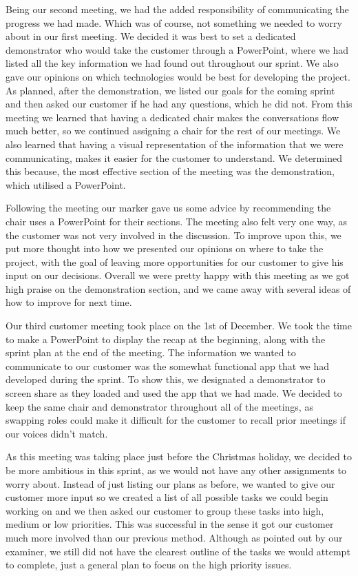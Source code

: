 \documentclass{l3proj}
\begin{document}
Being our second meeting, we had the added responsibility of communicating the progress we had made. Which was of course, not something we needed to worry about in our first meeting. We decided it was best to set a dedicated demonstrator who would take the customer through a PowerPoint, where we had listed all the key information we had found out throughout our sprint. We also gave our opinions on which technologies would be best for developing the project. As planned, after the demonstration, we listed our goals for the coming sprint and then asked our customer if he had any questions, which he did not. From this meeting we learned that having a dedicated chair makes the conversations flow much better, so we continued assigning a chair for the rest of our meetings. We also learned that having a visual representation of the information that we were communicating, makes it easier for the customer to understand. We determined this because, the most effective section of the meeting was the demonstration, which utilised a PowerPoint.\par
Following the meeting our marker gave us some advice by recommending the chair uses a PowerPoint for their sections. The meeting also felt very one way, as the customer was not very involved in the discussion. To improve upon this, we put more thought into how we presented our opinions on where to take the project, with the goal of leaving more opportunities for our customer to give his input on our decisions. Overall we were pretty happy with this meeting as we got high praise on the demonstration section, and we came away with several ideas of how to improve for next time.\par
Our third customer meeting took place on the 1st of December. We took the time to make a PowerPoint to display the recap at the beginning, along with the sprint plan at the end of the meeting. The information we wanted to communicate to our customer was the somewhat functional app that we had developed during the sprint. To show this, we designated a demonstrator to screen share as they loaded and used the app that we had made. We decided to keep the same chair and demonstrator throughout all of the meetings, as swapping roles could make it difficult for the customer to recall prior meetings if our voices didn't match.\par
As this meeting was taking place just before the Christmas holiday, we decided to be more ambitious in this sprint, as we would not have any other assignments to worry about. Instead of just listing our plans as before, we wanted to give our customer more input so we created a list of all possible tasks we could begin working on and we then asked our customer to group these tasks into high, medium or low priorities. This was successful in the sense it got our customer much more involved than our previous method. Although as pointed out by our examiner, we still did not have the clearest outline of the tasks we would attempt to complete, just a general plan to focus on the high priority issues.\par
\end{document}
